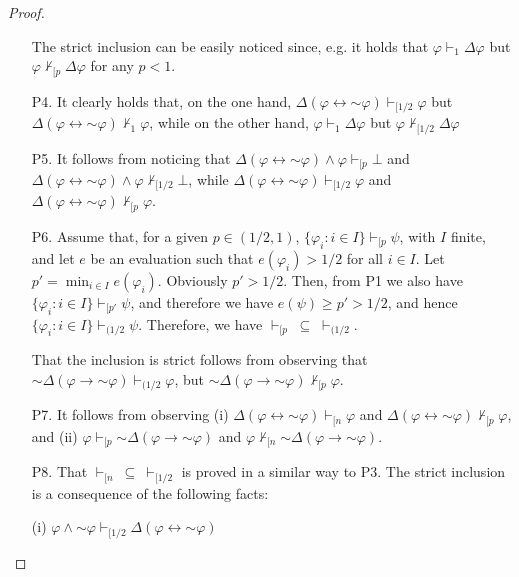 \documentclass[10pt,a4paper]{amsart}
\newcommand{\ninv}{\mathord{\sim}}
\begin{document}
\begin{proof}
\begin{enumerate}
The strict inclusion can be easily noticed since, e.g. it holds that  $\varphi \vdash_1 \Delta \varphi$ but $\varphi \nvdash_{[p} \Delta \varphi$ for any $p < 1$.


\item[P4.] It clearly holds that, on the one hand, $\Delta(\varphi \leftrightarrow \ninv \varphi) \vdash_{[1/2} \varphi$ but $\Delta(\varphi \leftrightarrow \ninv \varphi) \nvdash_{1} \varphi$, while on the other hand,
$\varphi \vdash_1 \Delta \varphi$ but $\varphi \nvdash_{[1/2} \Delta \varphi$

\item[P5.]  It follows from noticing that $\Delta(\varphi \leftrightarrow \ninv \varphi) \land \varphi \vdash_{[p} \bot$ and $\Delta(\varphi \leftrightarrow \ninv \varphi) \land \varphi \nvdash_{[1/2} \bot$, while
$\Delta(\varphi \leftrightarrow \ninv \varphi) \vdash_{[1/2} \varphi$ and $\Delta(\varphi \leftrightarrow \ninv \varphi) \nvdash_{[p} \varphi$.

\item[P6.]
Assume that, for a given $p  \in (1/2,1)$, $\{\varphi_i :  i \in I\} \vdash_{[p} \psi$, with $I$ finite, and let $e$ be an evaluation such that $e(\varphi_i) > 1/2 $ for all $i \in I$. 
Let $p' = \min_{i \in I} e(\varphi_i)$. Obviously $p' > 1/2$. Then, from P1 we also have $\{\varphi_i :  i \in I\} \vdash_{[p'} \psi$, and therefore we have $e(\psi) \geq p' > 1/2$, and hence $\{\varphi_i :  i \in I\} \vdash_{(1/2} \psi$. Therefore, we have $\vdash_{[p}  \; \subseteq  \; \vdash_{(1/2}$.

That the inclusion is strict follows from observing that $\ninv \Delta (\varphi \to \ninv \varphi) \vdash_{(1/2} \varphi$, but $ \ninv \Delta (\varphi \to \ninv \varphi) \nvdash_{[p} \varphi$.

\item[P7.]  It follows from observing (i) $\Delta(\varphi \leftrightarrow \ninv \varphi) \vdash_{[n} \varphi$ and $\Delta(\varphi \leftrightarrow \ninv \varphi) \nvdash_{[p} \varphi$, and  (ii)
$ \varphi \vdash_{[p} \ninv \Delta (\varphi \to  \ninv \varphi)$ and $\varphi \nvdash_{[n} \ninv \Delta (\varphi \to \ninv \varphi)$.

\item[P8.]  That $\vdash_{[n} ~\subseteq ~\vdash_{[1/2}$  is proved in a similar way to P3. The strict inclusion is a consequence of the following facts:

(i) $\varphi \land \ninv \varphi \vdash_{[1/2} \Delta(\varphi \leftrightarrow \ninv \varphi)$


\end{enumerate}
\end{proof}
\end{document}
